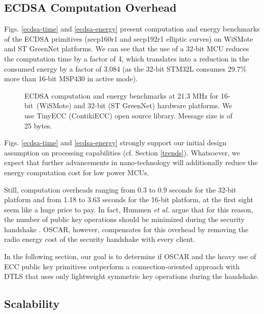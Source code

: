 \documentclass[conference]{IEEEtran}
\begin{document}
\subsection{ECDSA Computation Overhead}
Figs. \ref{ecdsa-time} and \ref{ecdsa-energy} present computation and energy
benchmarks of the ECDSA primitives (secp160r1 and secp192r1 elliptic curves) on
WiSMote and ST GreenNet platforms. We can see that the use of a 32-bit MCU
reduces the computation time by a factor of 4, which translates into a reduction
in the consumed energy by a factor of 3.084 (as the 32-bit STM32L consumes 29.7\% more than 16-bit MSP430 in active mode). 
\begin{figure}[htp]

\noindent
\centering
{}
\hspace{-0.37cm}
\caption{ECDSA computation and energy benchmarks at 21.3 MHz for
  16-bit~(WiSMote) and 32-bit (ST GreenNet) hardware platforms. We use TinyECC
  (ContikiECC) open source library. Message size is of 25 bytes.}
\end{figure} 


Figs. \ref{ecdsa-time} and \ref{ecdsa-energy} strongly support our initial
design assumption on processing capabilities (cf. Section
\ref{trends}). Whatsoever, we expect that further advancements in
nano-technology will additionally reduce the energy computation cost for low power MCUs.

Still, computation overheads ranging from 0.3 to 0.9 seconds for the 32-bit
platform and from 1.18 to 3.63 seconds for the 16-bit platform, at the first
sight seem like a huge price to pay. In fact, Hummen \emph{et al.} argue that
for this reason, the number of public key operations should be minimized during the security handshake  \cite{hummen-certificate}. OSCAR, however, compensates for this overhead by removing the radio energy cost of the security handshake with every client.

In the following section, our goal is to determine if OSCAR and the heavy use of ECC public key primitives outperform a connection-oriented approach with DTLS that uses only lightweight symmetric key operations during the handshake.


\subsection{Scalability}
\end{document}
